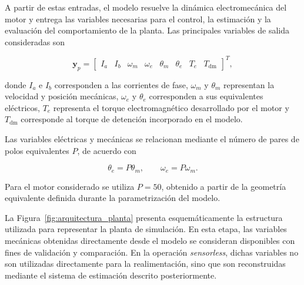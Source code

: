 A partir de estas entradas, el modelo resuelve la dinámica
electromecánica del motor y entrega las variables necesarias para el
control, la estimación y la evaluación del comportamiento de la
planta. Las principales variables de salida consideradas son

\begin{equation}
    \mathbf{y}_p =
    \begin{bmatrix}
        I_a &
        I_b &
        \omega_m &
        \omega_e &
        \theta_m &
        \theta_e &
        T_e &
        T_{\mathrm{dm}}
    \end{bmatrix}^{T},
    \label{eq:salidas_planta}
\end{equation}

donde $I_a$ e $I_b$ corresponden a las corrientes de fase,
$\omega_m$ y $\theta_m$ representan la velocidad y posición
mecánicas, $\omega_e$ y $\theta_e$ corresponden a sus equivalentes
eléctricos, $T_e$ representa el torque electromagnético desarrollado
por el motor y $T_{\mathrm{dm}}$ corresponde al torque de detención
incorporado en el modelo.

Las variables eléctricas y mecánicas se relacionan mediante el número
de pares de polos equivalentes $P$, de acuerdo con

\begin{equation}
    \theta_e = P\theta_m,
    \qquad
    \omega_e = P\omega_m.
    \label{eq:relacion_electrica_mecanica}
\end{equation}

Para el motor considerado se utiliza $P=50$, obtenido a partir de la
geometría equivalente definida durante la parametrización del modelo.

La Figura~\ref{fig:arquitectura_planta} presenta esquemáticamente la
estructura utilizada para representar la planta de simulación. En esta
etapa, las variables mecánicas obtenidas directamente desde el modelo
se consideran disponibles con fines de validación y comparación. En
la operación \textit{sensorless}, dichas variables no son utilizadas
directamente para la realimentación, sino que son reconstruidas
mediante el sistema de estimación descrito posteriormente.

